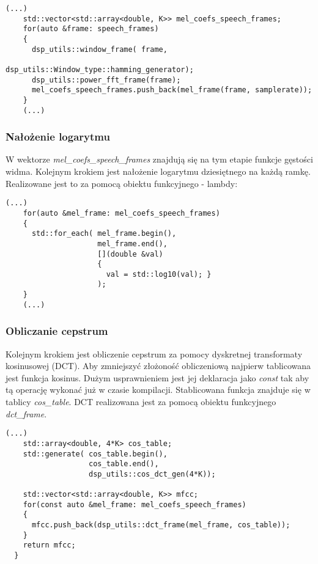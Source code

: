 \begin{lstlisting}[style=lst:cpp, caption=Funkcja \textit{mfcc\_extraction} - obliczanie widma gęstości mocy\label{lst:mfccpower}]
    (...)
    std::vector<std::array<double, K>> mel_coefs_speech_frames;
    for(auto &frame: speech_frames)
    {
      dsp_utils::window_frame( frame,
                               dsp_utils::Window_type::hamming_generator);
      dsp_utils::power_fft_frame(frame);
      mel_coefs_speech_frames.push_back(mel_frame(frame, samplerate));
    }
    (...)
\end{lstlisting}

\subsubsection{Nałożenie logarytmu}

W wektorze \textit{mel\_coefs\_speech\_frames} znajdują się na tym etapie funkcje gęstości widma. Kolejnym krokiem jest nałożenie logarytmu dziesiętnego na każdą ramkę. Realizowane jest to za pomocą obiektu funkcyjnego - lambdy: 

\begin{lstlisting}[style=lst:cpp, caption=Funkcja \textit{mfcc\_extraction} - obliczanie logarytmu widma gęstości mocy \label{lst:mfcclog}]
    (...)
    for(auto &mel_frame: mel_coefs_speech_frames)
    {
      std::for_each( mel_frame.begin(),
                     mel_frame.end(),
                     [](double &val)
                     {
                       val = std::log10(val); }
                     );
    } 
    (...)
\end{lstlisting}

\subsubsection{Obliczanie cepstrum}

Kolejnym krokiem jest obliczenie cepstrum za pomocy dyskretnej transformaty kosinusowej (DCT). Aby zmniejszyć złożoność obliczeniową najpierw tablicowana jest funkcja kosinus. Dużym usprawnieniem jest jej deklaracja jako \textit{const} tak aby tą operację wykonać już w czasie kompilacji. Stablicowana funkcja znajduje się w tablicy \textit{cos\_table}. DCT realizowana jest za pomocą obiektu funkcyjnego \textit{dct\_frame}.
    
\begin{lstlisting}[style=lst:cpp, caption=Funkcja \textit{mfcc\_extraction} - obliczanie cepstrum \label{lst:mfcccepstrum}]
    (...)
    std::array<double, 4*K> cos_table;
    std::generate( cos_table.begin(),
                   cos_table.end(),
                   dsp_utils::cos_dct_gen(4*K));

    std::vector<std::array<double, K>> mfcc;
    for(const auto &mel_frame: mel_coefs_speech_frames)
    {
      mfcc.push_back(dsp_utils::dct_frame(mel_frame, cos_table));
    }
    return mfcc;
  }
\end{lstlisting}

